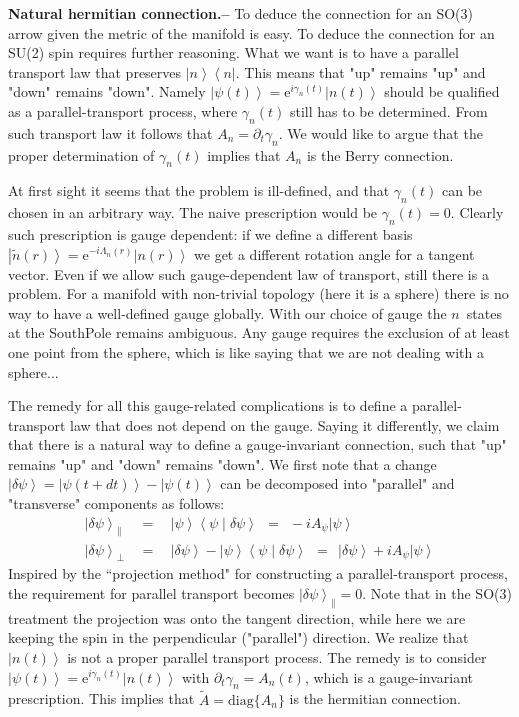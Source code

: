 \documentclass[onecolumn,fleqn, 11pt]{revtex4}
\newcommand{\eexp}{\mathrm{e}^}
\newcommand{\bra}[1]{\left\langle #1 \right|}
\newcommand{\ket}[1]{\left| #1 \right\rangle}
\newcommand{\Braket}[2]{\left\langle #1 \middle| #2 \right\rangle}
\newcommand{\beq}{\begin{eqnarray}}
\newcommand{\eeq}{\end{eqnarray}}
\begin{document}
{\bf Natural hermitian connection.-- } 
To deduce the connection for an SO(3) arrow given the metric of the manifold is easy.
To deduce the connection for an SU(2) spin requires further reasoning. 
What we want is to have a  parallel transport law that preserves $\ket{n}\!\bra{n}$. 
This means that "up" remains "up" and "down" remains "down". 
Namely ${\ket{\psi(t)} = \eexp{i\gamma_n(t)} \ket{n(t)}}$ should be qualified 
as a parallel-transport process, where $\gamma_n(t)$ still has to be determined. 
From such transport law it follows that $A_n=\partial_t\gamma_n$. 
We would like to argue that the proper determination of $\gamma_n(t)$ implies 
that $A_n$ is the Berry connection.  

At first sight it seems that the problem is ill-defined, and that $\gamma_n(t)$ 
can be chosen in an arbitrary way. The naive prescription would be ${\gamma_n(t)=0}$. 
Clearly such prescription is gauge dependent: 
if we define a different basis ${ \ket{\tilde{n}(r)}=\eexp{-i\Lambda_n(r)} \ket{n(r)} }$ 
we get a different rotation angle for a tangent vector.    
Even if we allow such gauge-dependent law of transport, still there is a problem. 
For a manifold with non-trivial topology (here it is a sphere) 
there is no way to have a well-defined gauge globally.
With our choice of gauge the $n$~states at the SouthPole remains ambiguous.  
Any gauge requires the exclusion of at least one point from the sphere, 
which is like saying that we are not dealing with a sphere...

The remedy for all this gauge-related complications is to define 
a parallel-transport law that does not depend on the gauge.
Saying it differently, we claim that there is a natural way to define a gauge-invariant connection, 
such that "up" remains "up" and "down" remains "down".  
We first note that a change ${\ket{\delta\psi} = \ket{\psi(t{+}dt)}- \ket{\psi(t)}}$
can be decomposed into "parallel" and "transverse" components as follows:
\beq
\ket{\delta\psi}_{\parallel}  \ \ &=& \ \ \ket{\psi}\Braket{\psi}{\delta \psi} \ \ = \ \ -iA_{\psi} \ket{\psi} \\  
\ket{\delta \psi}_{\perp} \ \ &=& \ \ \ket{\delta \psi} -  \ket{\psi}\Braket{\psi}{\delta \psi} \ \ = \ \ \ket{\delta \psi} + iA_{\psi} \ket{\psi}
\eeq  
Inspired by the ``projection method" for constructing a parallel-transport process,   
the requirement for parallel transport becomes ${\ket{\delta\psi}_{\parallel}=0}$.
Note that in the SO(3) treatment the projection was onto the tangent direction, 
while here we are keeping the spin in the perpendicular ("parallel") direction.   
We realize that $\ket{n(t)}$ is not a proper parallel transport process. 
The remedy is to consider ${\ket{\psi(t)} = \eexp{i\gamma_n(t)} \ket{n(t)}}$
with ${\partial_t\gamma_n = A_n(t)}$, which is a gauge-invariant prescription.   
This implies that $\tilde{A}=\text{diag}\{A_n\}$ is the hermitian connection. 
\end{document}
